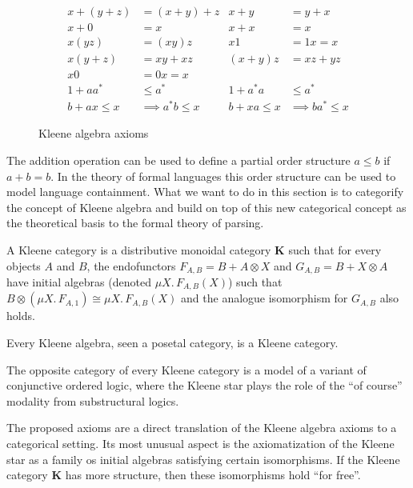 \documentclass[acmsmall,anonymous,review,screen]{acmart}
\newcommand{\cat}[1]{\mathbf{#1}}
\begin{document}
\begin{figure}
  \begin{align*}
    x + (y + z) &= (x + y) + z & x + y &= y + x\\
    x + 0 &= x & x + x &= x\\
    x(yz) &= (xy)z & x1 &= 1x = x\\
    x(y + z) &= xy + xz & (x + y)z &= xz + yz\\
    x0 &= 0x = x & & \\
    1 + aa^* &\leq a^* & 1 + a^*a &\leq a^*\\
     b + ax \leq x &\implies a^*b \leq x &  b + xa \leq x &\implies ba^* \leq x
  \end{align*}
  \label{fig:axioms}
  \caption{Kleene algebra axioms}
\end{figure}


The addition operation can be used to define a partial order structure
$a \leq b$ if $a + b = b$. In the theory of formal languages this
order structure can be used to model language containment. What we
want to do in this section is to categorify the concept of Kleene
algebra and build on top of this new categorical concept as the
theoretical basis to the formal theory of parsing.


\begin{definition}
  A Kleene category is a distributive monoidal category $\cat{K}$
  such that for every objects $A$ and $B$, the endofunctors $F_{A, B}
  = B + A \otimes X$ and $G_{A, B} = B + X \otimes A$ have initial
  algebras (denoted $\mu X.\, F_{A, B}(X)$) such that $B \otimes (\mu
  X.\, F_{A, 1}) \cong \mu X.\, F_{A, B}(X)$ and the analogue isomorphism
  for $G_{A,B}$ also holds.
\end{definition}

\begin{example}
  Every Kleene algebra, seen a posetal category, is a Kleene category.
\end{example}

\begin{example}
  The opposite category of every Kleene category is a model of a variant of
  conjunctive ordered logic, where the Kleene star plays the role of the ``of
  course'' modality from substructural logics.
\end{example}

The proposed axioms are a direct translation of the Kleene algebra
axioms to a categorical setting. Its most unusual aspect is the
axiomatization of the Kleene star as a family os initial algebras
satisfying certain isomorphisms. If the Kleene category $\cat{K}$ has
more structure, then these isomorphisms hold ``for free''.
\end{document}
